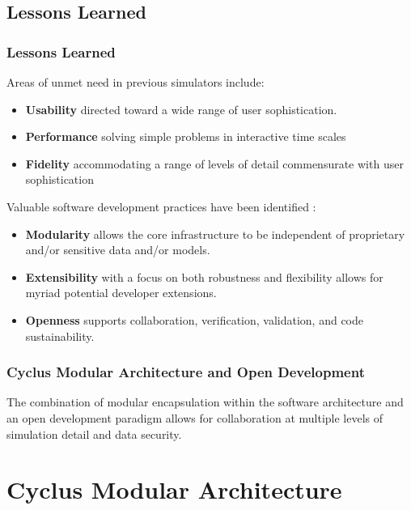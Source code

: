 \documentclass[9pt]{beamer}
\begin{document}
\subsection{Lessons Learned}
\begin{frame}[ctb!]
  \frametitle{Lessons Learned}
  Areas of unmet need in previous simulators include:
  \begin{itemize}
    \item \textbf{Usability} directed toward a wide range of user 
      sophistication.
    \item \textbf{Performance} solving simple problems in interactive time 
      scales
    \item \textbf{Fidelity} accommodating a range of levels of detail 
      commensurate with user sophistication
  \end{itemize}

  Valuable software development practices have been identified 
  \cite{huff_cyclus:_2010}\cite{huff_next_2010}: 
  \begin{itemize}
    \item{\textbf{Modularity}} allows the core infrastructure to be independent of 
      proprietary and/or sensitive data and/or models.
    \item{\textbf{Extensibility}} with a focus on both robustness and flexibility 
      allows for myriad potential developer extensions.
    \item{\textbf{Openness}} supports collaboration, verification, validation, 
      and code sustainability.
  \end{itemize}
\end{frame}
\begin{frame}
  \frametitle{Cyclus Modular Architecture and Open Development}
  The combination of modular encapsulation within the software
  architecture and an open development paradigm allows for collaboration
  at multiple levels of simulation detail and data security.
\end{frame}

\section{Cyclus Modular Architecture}
\end{document}
